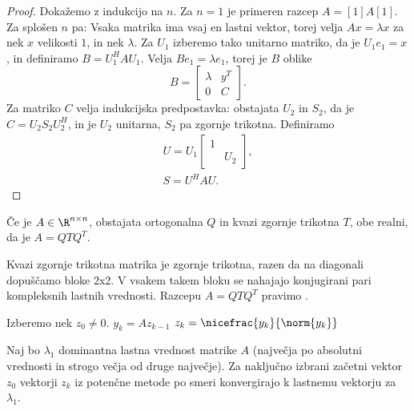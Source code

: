 \begin{proof}
  Dokažemo z indukcijo na $n$.
  Za $n = 1$ je primeren razcep $A = [1] A [1]$.
  Za splošen $n$ pa:
  Vsaka matrika ima vsaj en lastni vektor, torej velja $Ax = \lambda x$ za nek
  $x$ velikosti $1$, in nek $\lambda$.
  Za $U_1$ izberemo tako unitarno matriko, da je $U_1 e_1 = x$, in definiramo $B
  = U_1^H A U_1$.
  Velja $B e_1 = \lambda e_1$, torej je $B$ oblike
  \[
	B =
	\begin{bmatrix}
	  \lambda & y^T \\ 0 & C
	\end{bmatrix}.
  \]
  Za matriko $C$ velja indukcijska predpostavka: obstajata $U_2$ in $S_2$, da je
  $C = U_2 S_2 U_2^H$, in je $U_2$ unitarna, $S_2$ pa zgornje trikotna.
  Definiramo
  \begin{gather*}
	U = U_1
	\begin{bmatrix}
	  1 & \\ & U_2
	\end{bmatrix},
	\\
	S = U^H A U.
  \end{gather*}
\end{proof}


\begin{izrek}
  Če je $A \in \R^{n \times n}$, obstajata ortogonalna $Q$ in kvazi zgornje
  trikotna $T$, obe realni, da je $A = QTQ^T$.
\end{izrek}

Kvazi zgornje trikotna matrika je zgornje trikotna, razen da na diagonali
dopuščamo bloke 2x2.
V vsakem takem bloku se nahajajo konjugirani pari kompleksnih lastnih vrednosti.
Razcepu $A = Q T Q^T$ pravimo .



\begin{algorithm}
  \caption{Potenčna metoda}
  \label{alg:potencna-metoda}
  \begin{algorithmic}
	\State Izberemo nek $z_0 \ne 0$.
	\State $y_k = A z_{k-1}$
	\State $z_k = \nicefrac{y_k}{\norm{y_k}}$
	\EndFor
  \end{algorithmic}
\end{algorithm}

\begin{izrek}
  Naj bo $\lambda_1$ dominantna lastna vrednost matrike $A$ (največja po
  absolutni vrednosti in strogo večja od druge največje).
  Za naključno izbrani začetni vektor $z_0$ vektorji $z_k$ iz potenčne metode po
  smeri konvergirajo k lastnemu vektorju za $\lambda_1$.
\end{izrek}

